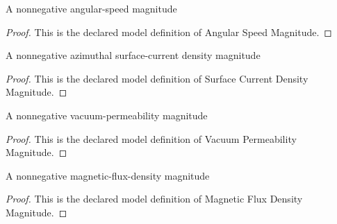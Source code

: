 \begin{definition}
  \label{def:physics:phyx-mini-0967:phyxminiproblems-problemphyxmini0967-angularspeedmagnitude}
  A nonnegative angular-speed magnitude
\end{definition}
\begin{proof}
  This is the declared model definition of Angular Speed Magnitude.
\end{proof}
\begin{definition}
  \label{def:physics:phyx-mini-0967:phyxminiproblems-problemphyxmini0967-surfacecurrentdensitymagnitude}
  A nonnegative azimuthal surface-current density magnitude
\end{definition}
\begin{proof}
  This is the declared model definition of Surface Current Density Magnitude.
\end{proof}
\begin{definition}
  \label{def:physics:phyx-mini-0967:phyxminiproblems-problemphyxmini0967-vacuumpermeabilitymagnitude}
  A nonnegative vacuum-permeability magnitude
\end{definition}
\begin{proof}
  This is the declared model definition of Vacuum Permeability Magnitude.
\end{proof}
\begin{definition}
  \label{def:physics:phyx-mini-0967:phyxminiproblems-problemphyxmini0967-magneticfluxdensitymagnitude}
  A nonnegative magnetic-flux-density magnitude
\end{definition}
\begin{proof}
  This is the declared model definition of Magnetic Flux Density Magnitude.
\end{proof}
